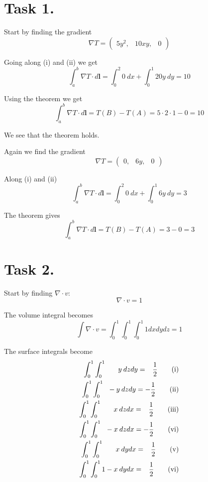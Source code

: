 \documentclass[a4paper,11pt]{article}
\begin{document}


\section*{Task 1.}
\begin{romanlist}
    \item Start by finding the gradient
        \[
            \nabla T = \begin{pmatrix} 5y^2, & 10xy, & 0 \end{pmatrix}
        \]

        Going along (i) and (ii) we get
        \[
            \int_{a}^{b} \nabla T \cdot d\mathbf{l} = \int_{0}^{2} 0\: dx + \int_{0}^{1} 20y\: dy = 10
        \]
        
        Using the theorem we get
        \[
            \int_{a}^{b} \nabla T \cdot d\mathbf{l} = T(B) - T(A) = 5\cdot 2 \cdot 1 - 0 = 10
        \]

        We see that the theorem holds.

    \item  Again we find the gradient
        \[
            \nabla T = \begin{pmatrix} 0, & 6y, & 0 \end{pmatrix}
        \]

        Along (i) and (ii)
        \[
            \int_{a}^{b} \nabla T \cdot d\mathbf{l} = \int_{0}^{2} 0\: dx + \int_{0}^{1} 6y\: dy = 3
        \]

        The theorem gives
        \[
            \int_{a}^{b} \nabla T \cdot d\mathbf{l} = T(B) - T(A) = 3 - 0 = 3
        \]
\end{romanlist}

\section*{Task 2.}
Start by finding $\nabla \cdot v$:
\[
    \nabla \cdot v = 1
\]

The volume integral becomes
\[
    \int \nabla \cdot v = \int_0^1 \int_0^1 \int_0^1 1 dx dy dz = 1
\]

\newpage
The surface integrals become
\begin{align}
    \int_0^1 \int_0^1 \hphantom{1 -}\:\:y\: dz dy = \hphantom{-}\frac{1}{2} \tag{i}     \\
    \int_0^1 \int_0^1 \hphantom{1  }-y\: dz dy =            -\frac{1}{2}    \tag{ii}    \\
    \int_0^1 \int_0^1 \hphantom{1 -}\:\:x\: dz dx = \hphantom{-}\frac{1}{2} \tag{iii}   \\
    \int_0^1 \int_0^1 \hphantom{1  }-x\: dz dx =            -\frac{1}{2}    \tag{vi}    \\
    \int_0^1 \int_0^1 \hphantom{1 -}\:\:x\: dy dx = \hphantom{-}\frac{1}{2} \tag{v}     \\
    \int_0^1 \int_0^1 1 - x\: dy dx = \hphantom{-}\frac{1}{2}               \tag{vi} 
\end{align}
\end{document}
